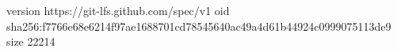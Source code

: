 version https://git-lfs.github.com/spec/v1
oid sha256:f7766e68e6214f97ae1688701cd78545640ac49a4d61b44924c0999075113de9
size 22214
